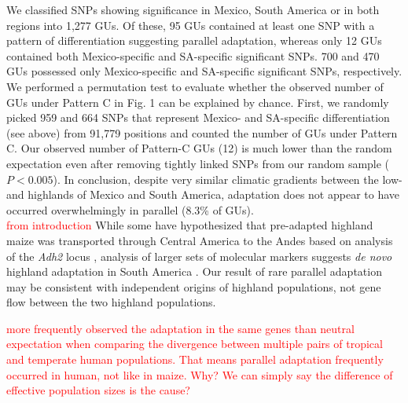 {{We classified SNPs showing significance in Mexico, South America or in both regions into 1,277 GUs. 
Of these, 95 GUs contained at least one SNP with a pattern of differentiation suggesting parallel adaptation, whereas only 12 GUs contained both Mexico-specific and SA-specific significant SNPs. 
700 and 470 GUs possessed only Mexico-specific and SA-specific significant SNPs, respectively.  
We performed a permutation test to evaluate whether the observed number of GUs under Pattern C in Fig. 1 can be explained by chance.
First, we randomly picked 959 and 664 SNPs that represent Mexico- and SA-specific differentiation (see above) from 91,779 positions and counted the number of GUs under Pattern C.
Our observed number of Pattern-C GUs (12) is much lower than the random expectation 
even after removing tightly linked SNPs from our random sample ($P<0.005$).
In conclusion, despite very similar climatic gradients between the low- and highlands of Mexico and South America, adaptation does not appear to have occurred overwhelmingly in parallel (8.3\% of GUs). 
\\


\textcolor{red}{from introduction}
While some have hypothesized that pre-adapted highland maize was transported through Central America to the Andes based on analysis of the \emph{Adh2} locus \cite[]{Freitas_2003_68}, analysis of larger sets of molecular markers suggests \emph{de novo} highland adaptation in South America \cite[]{Vigouroux_2008_21632329,vanHeerwaarden_2011_21189301}.  Our result of rare parallel adaptation may be consistent with independent origins of highland populations, not gene flow between the two highland populations.

\textcolor{red}{\cite{Tennessen_2011_21698142} more frequently observed the adaptation in the same genes than neutral expectation when comparing the divergence between multiple pairs of tropical and temperate human populations.  That means parallel adaptation frequently occurred in human, not like in maize.
Why?  We can simply say the difference of effective population sizes is the cause?}

}}
